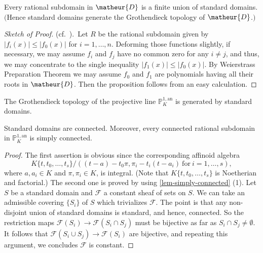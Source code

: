\begin{apppro}\label{pro-standart-domain}
Every rational subdomain in $\matheur{D}$ is a finite union of standard
domains.
$($Hence standard domains generate the Grothendieck topology of 
$\matheur{D}$.$)$
\end{apppro}

\noindent
\begin{proof}[Sketch of Proof] (cf.\ \cite[III.1.18]{sgamc}).\ 
Let $R$ be the rational subdomain given by $|f_i(x)|\leq |f_0(x)|$
for $i=1,\ldots,n$.
Deforming those functions slightly, if necessary, we may assume 
$f_i$ and $f_j$ have no common zero for any $i\neq j$, and thus,
we may concentrate to the single inequality $|f_1(x)|\leq |f_0(x)|$.
By Weierstrass Preparation Theorem we may assume $f_0$ and $f_1$ are
polynomials having all their roots in $\matheur{D}$.
Then the proposition follows from an easy calculation.
\end{proof}

\begin{appcor}\label{cor-projective-line}
The Grothendieck topology of the projective line $\mathbb{P}^{1,\mathrm{an}}_K$
is generated by standard domains.
\end{appcor}

\begin{apppro}\label{pro-standard}
Standard domains are connected.
Moreover, every connected rational subdomain in
$\mathbb{P}^{1,\mathrm{an}}_K$ is simply connected.
\end{apppro}

\begin{proof}
The first assertion is obvious since the corresponding affinoid algebra
\begin{equation*}
 K\{t,t_0,\ldots,t_s\}/((t-a)-t_0\pi,\pi_i-t_i(t-a_i)\ \mathrm{for}\ 
 i=1,\ldots,s),
\end{equation*}
where $a,a_i\in K$ and $\pi,\pi_i\in K$, is integral.
(Note that $K\{t,t_0,\ldots,t_s\}$ is Noetherian and factorial.)
The second one is proved by using \ref{lem-simply-connected} (1).
Let $S$ be a standard domain and $\mathscr{F}$ a constant sheaf of
sets on $S$.
We can take an admissible covering $\{S_i\}$ of $S$ which trivializes 
$\mathscr{F}$.
The point is that any non-disjoint union of standard domains is 
standard, and hence, connected.
So the restriction maps $\mathscr{F}(S_i)\rightarrow
\mathscr{F}(S_i\cap S_j)$ must be bijective as far as $S_i\cap S_j
\neq\emptyset$.
It follows that $\mathscr{F}(S_i\cup S_j)
\rightarrow\mathscr{F}(S_i)$ are bijective, and repeating this argument,
we concludes $\mathscr{F}$ is constant.
\end{proof}

